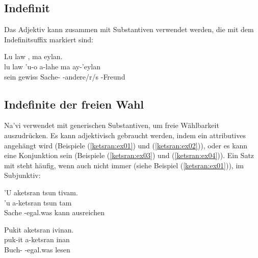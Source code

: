 \subsection{Indefinit} Das Adjektiv   kann zusammen mit Substantiven verwendet werden, die mit dem Indefinitsuffix  markiert sind:

\begin{interlin}
	\glll \Npawl{}Lu law  , ma eylan. \\
	lu law 'u-o a-lahe ma ay-'eylan \\
	sein gewiss Sache- -andere/r/s  -Freund \\
\end{interlin}

\subsection{Indefinite der freien Wahl} Na'vi verwendet   mit generischen Substantiven, um freie Wählbarkeit auszudrücken. Es kann adjektivisch gebraucht werden, indem ein attributives  angehängt wird (Beispiele (\ref{ketsran:ex01}) und (\ref{ketsran:ex02})), oder es kann eine Konjunktion sein (Beispiele (\ref{ketsran:ex03}) und (\ref{ketsran:ex04})). Ein Satz mit  steht häufig, wenn auch nicht immer (siehe Beispiel (\ref{ketsran:ex01})), im Subjunktiv:

\begin{interlin} \label{ketsran:ex01}
	\glll \Npawl{}'U aketsran tsun tivam. \\
	'u a-ketsran tsun tam \\
	Sache -egal.was kann ausreichen \\
\end{interlin}

\begin{interlin} \label{ketsran:ex02}
	\glll \Npawl{}Pukit aketsran ivinan. \\
	puk-it a-ketsran inan \\
	Buch- -egal.was lesen \\
\end{interlin}

